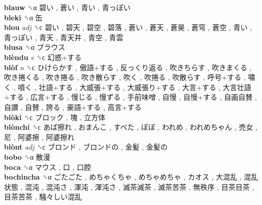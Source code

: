 \textbf{blauw} ␝α   碧い ,  蒼い ,  青い ,  青っぽい   \\
\textbf{bleki} ␝α   缶   \\
\textbf{blou} \emph{adj}  ␝ϲ   碧い ,  碧天 ,  碧空 ,  碧落 ,  蒼い ,  蒼天 ,  蒼昊 ,  蒼穹 ,  蒼空 ,  青い ,  青っぽい ,  青天 ,  青天井 ,  青空 ,  青雲   \\
\textbf{blusa} ␝α   ブラウス   \\
\textbf{blèndu} \emph{v}  ␝ϲ   幻惑+する   \\
\textbf{blòf} \emph{n}  ␝ϲ   ひけらかす ,  傲語+する ,  反っくり返る ,  吹きちらす ,  吹きまくる ,  吹き捲くる ,  吹き捲る ,  吹き散らす ,  吹く ,  吹捲る ,  吹散らす ,  呼号+する ,  嘯く ,  噴く ,  壮語+する ,  大威張+する ,  大威張り+する ,  大言+する ,  大言壮語+する ,  広言+する ,  慢じる ,  慢ずる ,  手前味噌 ,  自慢 ,  自慢+する ,  自画自賛 ,  自讃 ,  自賛 ,  誇る ,  豪語+する ,  高言+する   \\
\textbf{blòki} ␝ϲ   ブロック ,  塊 ,  立方体   \\
\textbf{blònchi} ␝ϲ   あば擦れ ,  おまんこ ,  すべた ,  ぼぼ ,  われめ ,  われめちゃん ,  売女 ,  尼 ,  阿婆擦 ,  阿婆擦れ   \\
\textbf{blònt} \emph{adj}  ␝ϲ   ブロンド ,  ブロンドの ,  金髪 ,  金髪の   \\
\textbf{bobo} ␝α   散漫   \\
\textbf{boca} ␝α   マウス ,  口 ,  口腔   \\
\textbf{bochincha} ␝α   ごたごた ,  めちゃくちゃ ,  めちゃめちゃ ,  カオス ,  大混乱 ,  混乱状態 ,  混沌 ,  混沌さ ,  渾沌 ,  渾沌さ ,  滅茶滅茶 ,  滅茶苦茶 ,  無秩序 ,  目茶目茶 ,  目茶苦茶 ,  騒々しい混乱   \\
